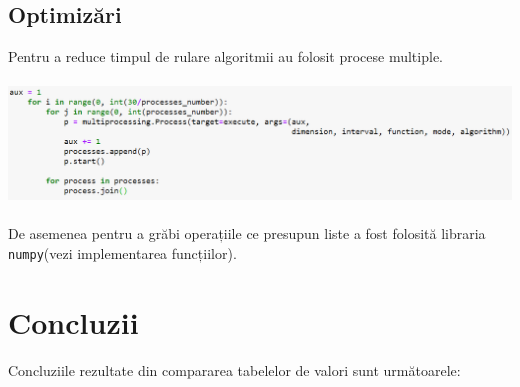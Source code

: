 \documentclass{article}
\begin{document}
\subsection*{Optimizări}
Pentru a reduce timpul de rulare algoritmii au folosit procese multiple.\\\\
\includegraphics[width=\textwidth]{4e}\\\\
De asemenea pentru a grăbi operațiile ce presupun liste a fost folosită libraria \texttt{numpy}(vezi implementarea funcțiilor).

\section{Concluzii}
Concluziile rezultate din compararea tabelelor de valori sunt următoarele:\\
\end{document}
